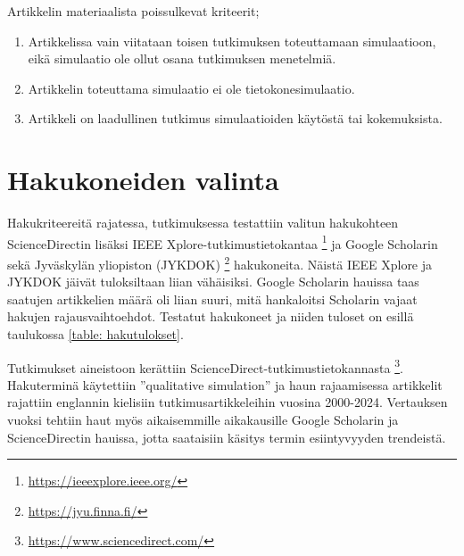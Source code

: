 \documentclass[utf8]{gradu3}
\begin{document}
Artikkelin materiaalista poissulkevat kriteerit;
\begin{enumerate}
    \item Artikkelissa vain viitataan toisen tutkimuksen toteuttamaan simulaatioon, eikä simulaatio ole ollut osana tutkimuksen menetelmiä.
    \item Artikkelin toteuttama simulaatio ei ole tietokonesimulaatio.
    \item Artikkeli on laadullinen tutkimus simulaatioiden käytöstä tai kokemuksista.
\end{enumerate}

\section{Hakukoneiden valinta} \label{hakukoneiden valinta}
Hakukriteereitä rajatessa, tutkimuksessa testattiin valitun hakukohteen ScienceDirectin lisäksi IEEE Xplore-tutkimustietokantaa 
\footnote{\url{https://ieeexplore.ieee.org/}} ja Google Scholarin 
sekä Jyväskylän yliopiston (JYKDOK) \footnote{\url{https://jyu.finna.fi/}} hakukoneita. Näistä IEEE Xplore ja JYKDOK jäivät tuloksiltaan liian vähäisiksi.
Google Scholarin hauissa taas saatujen artikkelien määrä oli liian suuri, 
mitä hankaloitsi Scholarin vajaat hakujen rajausvaihtoehdot. 
Testatut hakukoneet ja niiden tuloset on esillä taulukossa \ref{table: hakutulokset}.

Tutkimukset aineistoon kerättiin ScienceDirect-tutkimustietokannasta \footnote{\url{https://www.sciencedirect.com/}}. 
Hakuterminä käytettiin ''qualitative simulation'' 
ja haun rajaamisessa artikkelit 
rajattiin englannin kielisiin tutkimusartikkeleihin vuosina 2000-2024. 
Vertauksen vuoksi tehtiin haut myös 
aikaisemmille aikakausille Google Scholarin ja ScienceDirectin hauissa,
jotta saataisiin käsitys termin esiintyvyyden trendeistä.
\end{document}
